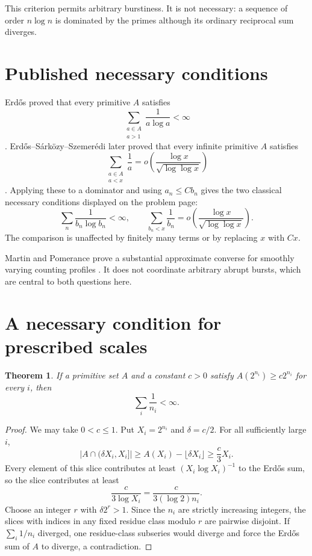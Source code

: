\documentclass[11pt]{article}
\newtheorem{theorem}{Theorem}[section]
\theoremstyle{definition}
\theoremstyle{remark}
\newcommand{\card}[1]{\lvert #1\rvert}
\begin{document}
This criterion permits arbitrary burstiness.  It is not necessary: a sequence of
order $n\log n$ is dominated by the primes although its ordinary reciprocal sum
diverges.

\section{Published necessary conditions}

Erd\H{o}s proved that every primitive $A$ satisfies
\[
  \sum_{\substack{a\in A\\a>1}}\frac1{a\log a}<\infty
\]
\cite{Erdos1935}.  Erd\H{o}s--S\'ark\"ozy--Szemer\'edi later proved that every
infinite primitive $A$ satisfies
\[
  \sum_{\substack{a\in A\\a<x}}\frac1a
  =o\!\left(\frac{\log x}{\sqrt{\log\log x}}\right)
\]
\cite{ESS1967}.  Applying these to a dominator and using $a_n\le Cb_n$ gives the two
classical necessary conditions displayed on the problem page:
\[
  \sum_n\frac1{b_n\log b_n}<\infty,
  \qquad
  \sum_{b_n<x}\frac1{b_n}
  =o\!\left(\frac{\log x}{\sqrt{\log\log x}}\right).
\]
The comparison is unaffected by finitely many terms or by replacing $x$ with $Cx$.

Martin and Pomerance prove a substantial approximate converse for smoothly varying
counting profiles \cite{MartinPomerance2011}.  It does not coordinate arbitrary abrupt
bursts, which are central to both questions here.

\section{A necessary condition for prescribed scales}

\begin{theorem}\label{thm:harmonic-scales}
If a primitive set $A$ and a constant $c>0$ satisfy
$A(2^{n_i})\ge c2^{n_i}$ for every $i$, then
\[
  \sum_i\frac1{n_i}<\infty.
\]
\end{theorem}

\begin{proof}
We may take $0<c\le1$.  Put $X_i=2^{n_i}$ and $\delta=c/2$.  For all sufficiently
large $i$,
\[
 \card{A\cap(\delta X_i,X_i]}
 \ge A(X_i)-\lfloor\delta X_i\rfloor
 \ge \frac c3X_i.
\]
Every element of this slice contributes at least $(X_i\log X_i)^{-1}$ to the
Erd\H{o}s sum, so the slice contributes at least
\[
  \frac{c}{3\log X_i}=\frac{c}{3(\log2)n_i}.
\]
Choose an integer $r$ with $\delta2^r>1$.  Since the $n_i$ are strictly increasing
integers, the slices with indices in any fixed residue class modulo $r$ are pairwise
disjoint.  If $\sum_i1/n_i$ diverged, one residue-class subseries would diverge and
force the Erd\H{o}s sum of $A$ to diverge, a contradiction.
\end{proof}
\end{document}
